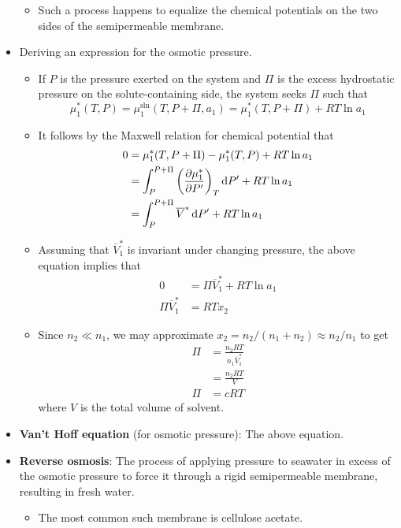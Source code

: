 \documentclass[../notes.tex]{subfiles}
\begin{document}
\begin{itemize}
    \begin{itemize}
        \item Such a process happens to equalize the chemical potentials on the two sides of the semipermeable membrane.
    \end{itemize}
    \item Deriving an expression for the osmotic pressure.
    \begin{itemize}
        \item If $P$ is the pressure exerted on the system and $\Pi$ is the excess hydrostatic pressure on the solute-containing side, the system seeks $\Pi$ such that
        \begin{equation*}
            \mu_1^*(T,P) = \mu_1^\text{sln}(T,P+\Pi,a_1)
            = \mu_1^*(T,P+\Pi)+RT\ln a_1
        \end{equation*}
        \item It follows by the Maxwell relation for chemical potential that
        \begin{align*}
            0 &= \mu_1^*(T,P+\Pi)-\mu_1^*(T,P)+RT\ln a_1\\
            &= \int_P^{P+\Pi}\left( \pdv{\mu_1^*}{P'} \right)_T\dd{P'}+RT\ln a_1\\
            &= \int_P^{P+\Pi}\overline{V}^*\dd{P'}+RT\ln a_1
        \end{align*}
        \item Assuming that $\overline{V}_1^*$ is invariant under changing pressure, the above equation implies that
        \begin{align*}
            0 &= \Pi\overline{V}_1^*+RT\ln a_1\\
            \Pi\overline{V}_1^* &= RTx_2
        \end{align*}
        \item Since $n_2\ll n_1$, we may approximate $x_2=n_2/(n_1+n_2)\approx n_2/n_1$ to get
        \begin{align*}
            \Pi &= \frac{n_2RT}{n_1\overline{V}_1^*}\\
            &= \frac{n_2RT}{V}\\
            \Pi &= cRT
        \end{align*}
        where $V$ is the total volume of solvent.
    \end{itemize}
    \item \textbf{Van't Hoff equation} (for osmotic pressure): The above equation.
    \item \textbf{Reverse osmosis}: The process of applying pressure to seawater in excess of the osmotic pressure to force it through a rigid semipermeable membrane, resulting in fresh water.
    \begin{itemize}
        \item The most common such membrane is cellulose acetate.
    \end{itemize}
\end{itemize}
\end{document}
